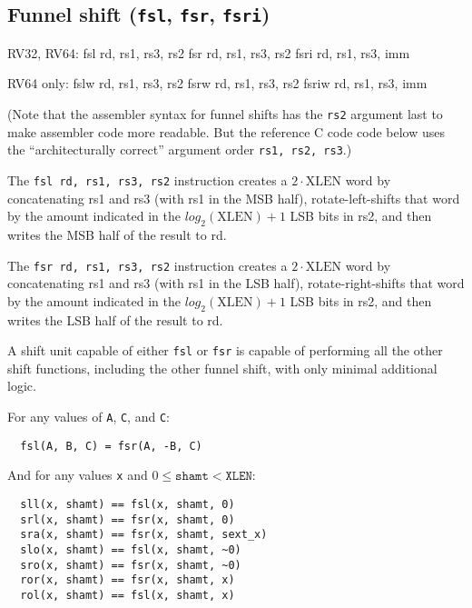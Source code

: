 \subsection{Funnel shift ({\tt fsl}, {\tt fsr}, {\tt fsri})}

\begin{rvb}
  RV32, RV64:
    fsl  rd, rs1, rs3, rs2
    fsr  rd, rs1, rs3, rs2
    fsri rd, rs1, rs3, imm

  RV64 only:
    fslw  rd, rs1, rs3, rs2
    fsrw  rd, rs1, rs3, rs2
    fsriw rd, rs1, rs3, imm
\end{rvb}

(Note that the assembler syntax for funnel shifts has the {\tt rs2} argument
last to make assembler code more readable. But the reference C code code below
uses the ``architecturally correct'' argument order {\tt rs1, rs2, rs3}.)

The {\tt fsl rd, rs1, rs3, rs2} instruction creates a $2\cdot\textrm{XLEN}$ word
by concatenating rs1 and rs3 (with rs1 in the MSB half), rotate-left-shifts that
word by the amount indicated in the $log_2(\textrm{XLEN})+1$ LSB bits in rs2, and
then writes the MSB half of the result to rd.

The {\tt fsr rd, rs1, rs3, rs2} instruction creates a $2\cdot\textrm{XLEN}$ word
by concatenating rs1 and rs3 (with rs1 in the LSB half), rotate-right-shifts that
word by the amount indicated in the $log_2(\textrm{XLEN})+1$ LSB bits in rs2, and
then writes the LSB half of the result to rd.





A shift unit capable of either {\tt fsl} or {\tt fsr} is capable of performing all
the other shift functions, including the other funnel shift, with only minimal additional
logic.

For any values of {\tt A}, {\tt C}, and {\tt C}:

\begin{minipage}{\linewidth}
\begin{verbatim}
  fsl(A, B, C) = fsr(A, -B, C)
\end{verbatim}
\end{minipage}

And for any values {\tt x} and $0 \le \texttt{shamt} < \texttt{XLEN}$:

\begin{minipage}{\linewidth}
\begin{verbatim}
  sll(x, shamt) == fsl(x, shamt, 0)
  srl(x, shamt) == fsr(x, shamt, 0)
  sra(x, shamt) == fsr(x, shamt, sext_x)
  slo(x, shamt) == fsl(x, shamt, ~0)
  sro(x, shamt) == fsr(x, shamt, ~0)
  ror(x, shamt) == fsr(x, shamt, x)
  rol(x, shamt) == fsl(x, shamt, x)
\end{verbatim}
\end{minipage}


